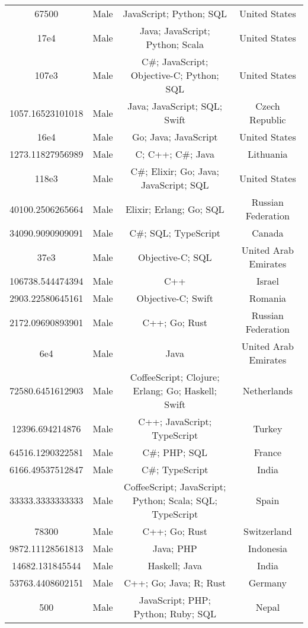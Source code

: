 \begin{center}
\begin{tabular}{ |c|c|c|c| }
67500  &  Male  &  JavaScript; Python; SQL  &  United States  \\ 
17e4  &  Male  &  Java; JavaScript; Python; Scala  &  United States  \\ 
107e3  &  Male  &  C\#; JavaScript; Objective-C; Python; SQL  &  United States  \\ 
1057.16523101018  &  Male  &  Java; JavaScript; SQL; Swift  &  Czech Republic  \\ 
16e4  &  Male  &  Go; Java; JavaScript  &  United States  \\ 
1273.11827956989  &  Male  &  C; C++; C\#; Java  &  Lithuania  \\ 
118e3  &  Male  &  C\#; Elixir; Go; Java; JavaScript; SQL  &  United States  \\ 
40100.2506265664  &  Male  &  Elixir; Erlang; Go; SQL  &  Russian Federation  \\ 
34090.9090909091  &  Male  &  C\#; SQL; TypeScript  &  Canada  \\ 
37e3  &  Male  &  Objective-C; SQL  &  United Arab Emirates  \\ 
106738.544474394  &  Male  &  C++  &  Israel  \\ 
2903.22580645161  &  Male  &  Objective-C; Swift  &  Romania  \\ 
2172.09690893901  &  Male  &  C++; Go; Rust  &  Russian Federation  \\ 
6e4  &  Male  &  Java  &  United Arab Emirates  \\ 
72580.6451612903  &  Male  &  CoffeeScript; Clojure; Erlang; Go; Haskell; Swift  &  Netherlands  \\ 
12396.694214876  &  Male  &  C++; JavaScript; TypeScript  &  Turkey  \\ 
64516.1290322581  &  Male  &  C\#; PHP; SQL  &  France  \\ 
6166.49537512847  &  Male  &  C\#; TypeScript  &  India  \\ 
33333.3333333333  &  Male  &  CoffeeScript; JavaScript; Python; Scala; SQL; TypeScript  &  Spain  \\ 
78300  &  Male  &  C++; Go; Rust  &  Switzerland  \\ 
9872.11128561813  &  Male  &  Java; PHP  &  Indonesia  \\ 
14682.131845544  &  Male  &  Haskell; Java  &  India  \\ 
53763.4408602151  &  Male  &  C++; Go; Java; R; Rust  &  Germany  \\ 
500  &  Male  &  JavaScript; PHP; Python; Ruby; SQL  &  Nepal  \\ 

\end{tabular}
\end{center}
